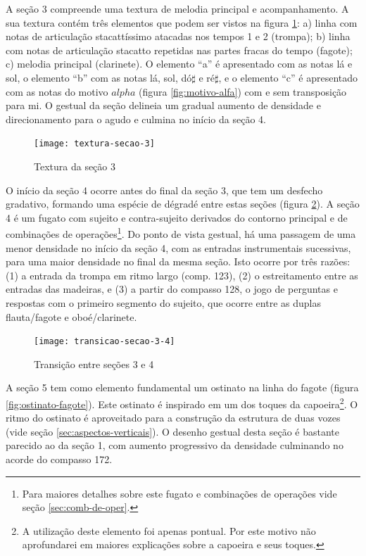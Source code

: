 A seção 3 compreende uma textura de melodia principal e
acompanhamento. A sua textura contém três elementos que podem ser
vistos na figura \ref{fig:textura-secao-3}: a) linha com notas de
articulação stacattíssimo atacadas nos tempos 1 e 2 (trompa); b) linha
com notas de articulação stacatto repetidas nas partes fracas do tempo
(fagote); c) melodia principal (clarinete). O elemento ``a'' é
apresentado com as notas lá e sol, o elemento ``b'' com as notas lá,
sol, dó$\sharp$ e ré$\sharp$, e o elemento ``c'' é apresentado com as
notas do motivo $alpha$ (figura \ref{fig:motivo-alfa}) com e sem
transposição para mi. O gestual da seção delineia um gradual aumento
de densidade e direcionamento para o agudo e culmina no início da
seção 4.

\begin{figure}
  \centering
  \texttt{[image: textura-secao-3]}
  \caption{Textura da seção 3}
  \label{fig:textura-secao-3}
\end{figure}

O início da seção 4 ocorre antes do final da seção 3, que tem um
desfecho gradativo, formando uma espécie de dégradé entre estas seções
(figura \ref{fig:transicao-secao-3-4}). A seção 4 é um fugato com
sujeito e contra-sujeito derivados do contorno principal e de
combinações de operações\footnote{Para maiores detalhes sobre este
  fugato e combinações de operações vide seção
  \ref{sec:comb-de-oper}.}. Do ponto de vista gestual, há uma passagem
de uma menor densidade no início da seção 4, com as entradas
instrumentais sucessivas, para uma maior densidade no final da mesma
seção. Isto ocorre por três razões: (1) a entrada da trompa em ritmo
largo (comp. 123), (2) o estreitamento entre as entradas das madeiras,
e (3) a partir do compasso 128, o jogo de perguntas e respostas com o
primeiro segmento do sujeito, que ocorre entre as duplas flauta/fagote
e oboé/clarinete.

\begin{figure}
  \centering
  \texttt{[image: transicao-secao-3-4]}
  \caption{Transição entre seções 3 e 4}
  \label{fig:transicao-secao-3-4}
\end{figure}

A seção 5 tem como elemento fundamental um ostinato na linha do fagote
(figura \ref{fig:ostinato-fagote}). Este ostinato é inspirado em um
dos toques da capoeira\footnote{A utilização deste elemento foi apenas
  pontual. Por este motivo não aprofundarei em maiores explicações
  sobre a capoeira e seus toques.}. O ritmo do ostinato é aproveitado
para a construção da estrutura de duas vozes (vide seção
\ref{sec:aspectos-verticais}). O desenho gestual desta seção é
bastante parecido ao da seção 1, com aumento progressivo da densidade
culminando no acorde do compasso 172.

